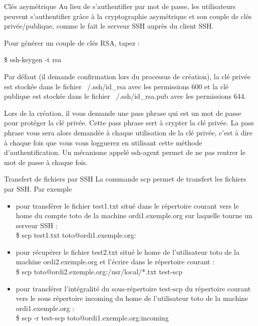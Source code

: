 \documentclass[10pt]{beamer}
\begin{document}
\begin{frame}{Clés asymétrique}
Au lieu de s'authentifier par mot de passe, les utilisateurs peuvent s'authentifier
grâce à la cryptographie asymétrique et son couple de clés privée/publique, comme
le fait le serveur SSH auprès du client SSH.
\pause

Pour générer un couple de clés RSA, tapez :

\$ \alert{ssh-keygen} -t rsa


Par défaut (il demande confirmation lors du processus de création), la clé privée est stockée dans le fichier \alert{~/.ssh/id\_rsa} avec les permissions \alert{600} et la clé publique est stockée dans le fichier \alert{~/.ssh/id\_rsa.pub} avec les permissions \alert{644}.
\pause

Lors de la création, il vous demande une pass phrase qui est un mot de passe pour protéger la clé privée. Cette pass phrase sert à crypter la clé privée. La pass phrase vous sera alors demandée à chaque utilisation de la clé privée, c'est à dire à chaque fois que vous vous logguerez en utilisant cette méthode d'authentification. Un mécanisme appelé ssh-agent permet de ne pas rentrer le mot de passe à chaque fois.
\end{frame}

\begin{frame}{Transfert de fichiers par SSH}
La commande \alert{scp} permet de transfert les fichiers par SSH. Par exemple

\begin{itemize}
\item pour transférer le fichier test1.txt situé dans le répertoire courant vers le
home du compte toto de la machine ordi1.exemple.org sur laquelle tourne
un serveur SSH :\\
\$ \alert{scp} test1.txt toto@ordi1.exemple.org:
\item pour récupérer le fichier test2.txt situé le home de l'utilisateur toto de la
machine ordi2.exemple.org et l'écrire dans le répertoire courant :\\
\$ \alert{scp} toto@ordi2.exemple.org:/usr/local/*.txt test-scp
\item pour transférer l'intégralité du sous-répertoire test-scp du répertoire courant
vers le sous répertoire incoming du home de l'utilisateur toto de la machine
ordi1.exemple.org :\\
\$ \alert{scp} -r test-scp toto@ordi1.exemple.org:incoming
\end{itemize}
\end{frame}
\end{document}

